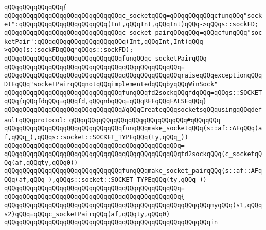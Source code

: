 \verb|qQQqqQQqqQQqqQQq{|\newline
\newline
\verb|qQQqqQQqqQQqqQQqqQQqqQQqqQQqqQQqc_socketqQQq=qQQqqQQqqQQqcfunqQQq"socket":qQQqqQQqqQQqqQQqqQQqqQQq(Int,qQQqInt,qQQqInt)qQQq->qQQqs::sockFD;|\newline
\newline
\verb|qQQqqQQqqQQqqQQqqQQqqQQqqQQqqQQqc_socket_pairqQQqqQQq=qQQqcfunqQQq"socketPair":qQQqqQQqqQQqqQQqqQQqqQQq(Int,qQQqInt,Int)qQQq->qQQq(s::sockFDqQQq*qQQqs::sockFD);|\newline
\newline
\verb|qQQqqQQqqQQqqQQqqQQqqQQqqQQqqQQqfunqQQqc_socketPairqQQq_|\newline
\verb|qQQqqQQqqQQqqQQqqQQqqQQqqQQqqQQqqQQqqQQqqQQqqQQq=|\newline
\verb|qQQqqQQqqQQqqQQqqQQqqQQqqQQqqQQqqQQqqQQqqQQqqQQqraiseqQQqexceptionqQQqDIEqQQq"socketPairqQQqnotqQQqimplementedqQQqbyqQQqWinSock"|\newline
\newline
\verb|qQQqqQQqqQQqqQQqqQQqqQQqqQQqqQQqfunqQQqfd2sockqQQqfdqQQq=qQQqs::SOCKETqQQq{qQQqfdqQQq=qQQqfd,qQQqnbqQQq=qQQqREFqQQqFALSEqQQq}|\newline
\newline
\verb|qQQqqQQqqQQqqQQqqQQqqQQqqQQqqQQq#qQQqCreateqQQqsocketsqQQqusingqQQqdefaultqQQqprotocol:|\newline
\verb|qQQqqQQqqQQqqQQqqQQqqQQqqQQqqQQq#qQQqqQQq|\newline
\verb|qQQqqQQqqQQqqQQqqQQqqQQqqQQqqQQqfunqQQqmake_socketqQQq(s::af::AFqQQq(af,qQQq_),qQQqs::socket::SOCKET_TYPEqQQq(ty,qQQq_))|\newline
\verb|qQQqqQQqqQQqqQQqqQQqqQQqqQQqqQQqqQQqqQQqqQQqqQQq=|\newline
\verb|qQQqqQQqqQQqqQQqqQQqqQQqqQQqqQQqqQQqqQQqqQQqqQQqfd2sockqQQq(c_socketqQQq(af,qQQqty,qQQq0))|\newline
\newline
\verb|qQQqqQQqqQQqqQQqqQQqqQQqqQQqqQQqfunqQQqmake_socket_pairqQQq(s::af::AFqQQq(af,qQQq_),qQQqs::socket::SOCKET_TYPEqQQq(ty,qQQq_))|\newline
\verb|qQQqqQQqqQQqqQQqqQQqqQQqqQQqqQQqqQQqqQQqqQQqqQQq=|\newline
\verb|qQQqqQQqqQQqqQQqqQQqqQQqqQQqqQQqqQQqqQQqqQQqqQQq{|\newline
\verb|qQQqqQQqqQQqqQQqqQQqqQQqqQQqqQQqqQQqqQQqqQQqqQQqqQQqqQQqmyqQQq(s1,qQQqs2)qQQq=qQQqc_socketPairqQQq(af,qQQqty,qQQq0)|\newline
\verb|qQQqqQQqqQQqqQQqqQQqqQQqqQQqqQQqqQQqqQQqqQQqqQQqqQQqqQQqin|\newline
